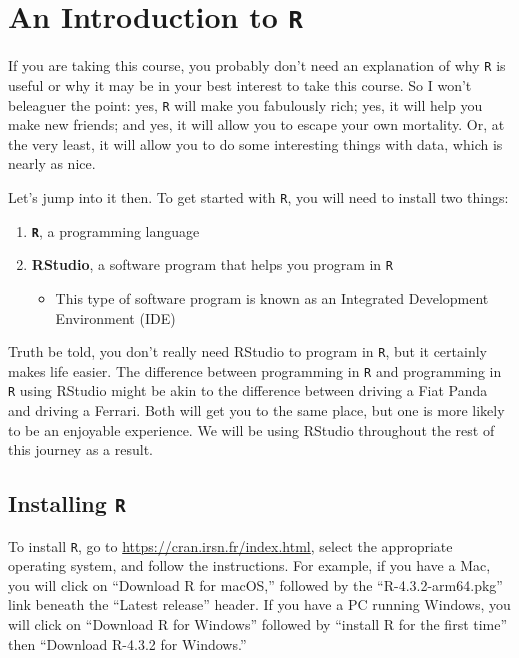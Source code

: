 \documentclass[
  letterpaper,
]{book}
\providecommand{\tightlist}{%
  \setlength{\itemsep}{0pt}\setlength{\parskip}{0pt}}\usepackage{longtable,booktabs,array}
\begin{document}

\hypertarget{an-introduction-to-r}{%
\chapter{\texorpdfstring{An Introduction to
\texttt{R}}{An Introduction to R}}\label{an-introduction-to-r}}

If you are taking this course, you probably don't need an explanation of
why \texttt{R} is useful or why it may be in your best interest to take
this course. So I won't beleaguer the point: yes, \texttt{R} will make
you fabulously rich; yes, it will help you make new friends; and yes, it
will allow you to escape your own mortality. Or, at the very least, it
will allow you to do some interesting things with data, which is nearly
as nice.

Let's jump into it then. To get started with \texttt{R}, you will need
to install two things:

\begin{enumerate}
\def\labelenumi{\arabic{enumi}.}
\item
  \textbf{\texttt{R}}, a programming language
\item
  \textbf{RStudio}, a software program that helps you program in
  \texttt{R}

  \begin{itemize}
  \tightlist
  \item
    This type of software program is known as an Integrated Development
    Environment (IDE)
  \end{itemize}
\end{enumerate}

Truth be told, you don't really need RStudio to program in \texttt{R},
but it certainly makes life easier. The difference between programming
in \texttt{R} and programming in \texttt{R} using RStudio might be akin
to the difference between driving a Fiat Panda and driving a Ferrari.
Both will get you to the same place, but one is more likely to be an
enjoyable experience. We will be using RStudio throughout the rest of
this journey as a result.

\hypertarget{installing-r}{%
\section{\texorpdfstring{Installing
\texttt{R}}{Installing R}}\label{installing-r}}

To install \texttt{R}, go to \url{https://cran.irsn.fr/index.html},
select the appropriate operating system, and follow the instructions.
For example, if you have a Mac, you will click on ``Download R for
macOS,'' followed by the ``R-4.3.2-arm64.pkg'' link beneath the ``Latest
release'' header. If you have a PC running Windows, you will click on
``Download R for Windows'' followed by ``install R for the first time''
then ``Download R-4.3.2 for Windows.''
\end{document}
